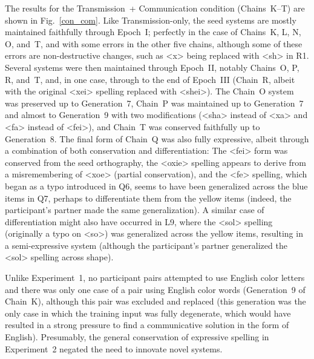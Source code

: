 \documentclass[doc,biblatex]{apa7}
\begin{document}
The results for the Transmission~+ Communication condition (Chains~K--T) are shown in Fig.~\ref{con_com}. Like Transmission-only, the seed systems are mostly maintained faithfully through Epoch~I; perfectly in the case of Chains~K, L, N, O, and~T, and with some errors in the other five chains, although some of these errors are non-destructive changes, such as <x> being replaced with <sh> in R1. Several systems were then maintained through Epoch~II, notably Chains~O, P, R, and~T, and, in one case, through to the end of Epoch~III (Chain~R, albeit with the original <xei> spelling replaced with <shei>). The Chain~O system was preserved up to Generation~7, Chain~P was maintained up to Generation~7 and almost to Generation~9 with two modifications (<sha> instead of <xa> and <fa> instead of <fei>), and Chain~T was conserved faithfully up to Generation~8. The final form of Chain~Q was also fully expressive, albeit through a combination of both conservation and differentiation: The <fei> form was conserved from the seed orthography, the <oxie> spelling appears to derive from a misremembering of <xoe> (partial conservation), and the <fe> spelling, which began as a typo introduced in Q6, seems to have been generalized across the blue items in Q7, perhaps to differentiate them from the yellow items (indeed, the participant's partner made the same generalization). A similar case of differentiation might also have occurred in L9, where the <sol> spelling (originally a typo on <so>) was generalized across the yellow items, resulting in a semi-expressive system (although the participant's partner generalized the <sol> spelling across shape).

Unlike Experiment~1, no participant pairs attempted to use English color letters and there was only one case of a pair using English color words (Generation~9 of Chain~K), although this pair was excluded and replaced (this generation was the only case in which the training input was fully degenerate, which would have resulted in a strong pressure to find a communicative solution in the form of English). Presumably, the general conservation of expressive spelling in Experiment~2 negated the need to innovate novel systems.
\end{document}
